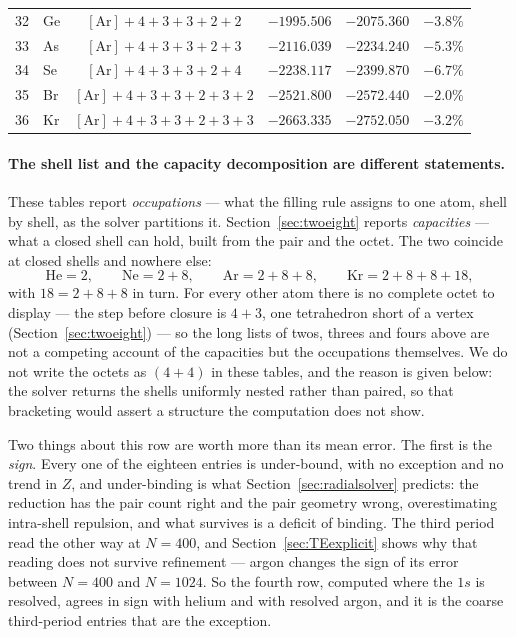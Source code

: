 \documentclass[11pt]{article}
\begin{document}
\begin{table}[t]
\begin{tabular}{llcrrr}
32 & Ge & $[\mathrm{Ar}]{+}4{+}3{+}3{+}2{+}2$ & $-1995.506$ & $-2075.360$ & $-3.8\%$ \\
33 & As & $[\mathrm{Ar}]{+}4{+}3{+}3{+}2{+}3$ & $-2116.039$ & $-2234.240$ & $-5.3\%$ \\
34 & Se & $[\mathrm{Ar}]{+}4{+}3{+}3{+}2{+}4$ & $-2238.117$ & $-2399.870$ & $-6.7\%$ \\
35 & Br & $[\mathrm{Ar}]{+}4{+}3{+}3{+}2{+}3{+}2$ & $-2521.800$ & $-2572.440$ & $-2.0\%$ \\
36 & Kr & $[\mathrm{Ar}]{+}4{+}3{+}3{+}2{+}3{+}3$ & $-2663.335$ & $-2752.050$ & $-3.2\%$ \\
\bottomrule
\end{tabular}
\end{table}

\paragraph{The shell list and the capacity decomposition are different statements.} These tables
report \emph{occupations} --- what the filling rule assigns to one atom, shell by shell, as the solver
partitions it. Section~\ref{sec:twoeight} reports \emph{capacities} --- what a closed shell can hold,
built from the pair and the octet. The two coincide at closed shells and nowhere else:
\[
\mathrm{He}=2,\qquad \mathrm{Ne}=2{+}8,\qquad \mathrm{Ar}=2{+}8{+}8,\qquad
\mathrm{Kr}=2{+}8{+}8{+}18 ,
\]
with $18=2{+}8{+}8$ in turn. For every other atom there is no complete octet to display --- the step
before closure is $4{+}3$, one tetrahedron short of a vertex (Section~\ref{sec:twoeight}) --- so the
long lists of twos, threes and fours above are not a competing account of the capacities but the
occupations themselves. We do not write the octets as $(4{+}4)$ in these tables, and the reason is
given below: the solver returns the shells uniformly nested rather than paired, so that bracketing
would assert a structure the computation does not show.

Two things about this row are worth more than its mean error. The first is the \emph{sign}. Every one
of the eighteen entries is under-bound, with no exception and no trend in $Z$, and under-binding is
what Section~\ref{sec:radialsolver} predicts: the reduction has the pair count right and the pair
geometry wrong, overestimating intra-shell repulsion, and what survives is a deficit of binding. The
third period read the other way at $N=400$, and Section~\ref{sec:TEexplicit} shows why that reading
does not survive refinement --- argon changes the sign of its error between $N=400$ and $N=1024$. So
the fourth row, computed where the $1s$ is resolved, agrees in sign with helium and with resolved
argon, and it is the coarse third-period entries that are the exception.
\end{document}
